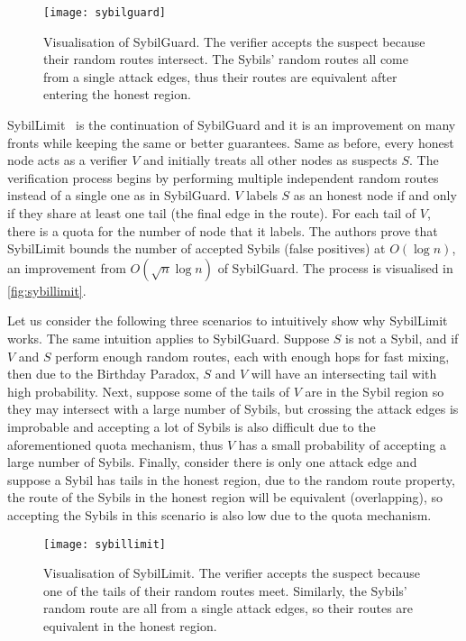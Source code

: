 \begin{figure}
  \centering
  \texttt{[image: sybilguard]}
  \caption{Visualisation of SybilGuard. The verifier accepts the suspect because
    their random routes intersect. The Sybils' random routes all come from a
    single attack edges, thus their routes are equivalent after entering the
    honest region.}
  \label{fig:sybilguard}
\end{figure}

SybilLimit~\cite{yu2008sybillimit} is the continuation of SybilGuard and it is
an improvement on many fronts while keeping the same or better guarantees. Same
as before, every honest node acts as a verifier $V$ and initially treats all
other nodes as suspects $S$. The verification process begins by performing
multiple independent random routes instead of a single one as in SybilGuard. $V$
labels $S$ as an honest node if and only if they share at least one tail (the
final edge in the route). For each tail of $V$, there is a quota for the number
of node that it labels. The authors prove that SybilLimit bounds the number of
accepted Sybils (false positives) at $O(\log{n})$, an improvement from
$O(\sqrt{n} \log{n})$ of SybilGuard. The process is visualised in
\autoref{fig:sybillimit}.

Let us consider the following three scenarios to intuitively show why SybilLimit
works. The same intuition applies to SybilGuard. Suppose $S$ is not a Sybil, and
if $V$ and $S$ perform enough random routes, each with enough hops for fast
mixing, then due to the Birthday Paradox, $S$ and $V$ will have an intersecting
tail with high probability. Next, suppose some of the tails of $V$ are in the
Sybil region so they may intersect with a large number of Sybils, but crossing
the attack edges is improbable and accepting a lot of Sybils is also difficult
due to the aforementioned quota mechanism, thus $V$ has a small probability of
accepting a large number of Sybils. Finally, consider there is only one attack
edge and suppose a Sybil has tails in the honest region, due to the random route
property, the route of the Sybils in the honest region will be equivalent
(overlapping), so accepting the Sybils in this scenario is also low due to the
quota mechanism.

\begin{figure}
  \centering
  \texttt{[image: sybillimit]}
  \caption{Visualisation of SybilLimit. The verifier accepts the suspect because
    one of the tails of their random routes meet. Similarly, the Sybils' random
    route are all from a single attack edges, so their routes are equivalent in
    the honest region.}
  \label{fig:sybillimit}
\end{figure}

